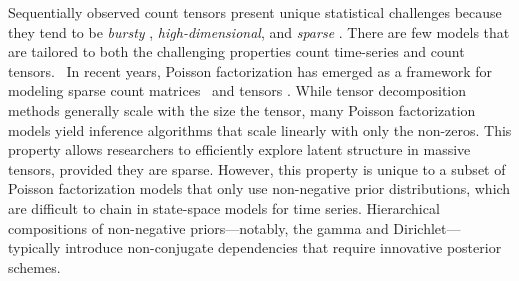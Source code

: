 \documentclass{article}
\begin{document}
% 
Sequentially observed count tensors present unique statistical challenges because they tend to be \emph{bursty} \cite{kleinberg2003bursty}, \emph{high-dimensional}, and \emph{sparse} \cite{chi2012tensors,kunihama2013bayesian}. There are few models that are tailored to both the challenging properties count time-series and count tensors.~
In recent years, Poisson factorization has emerged as a framework for modeling sparse count matrices~\cite{canny2004gap,Dunson2005bayesianlatent,titsias2008infinite,cemgil2009bayesian,zhou2011beta,gopalan2013efficient} and tensors \cite{chi2012tensors,ermis2014bayesian,schein2015bayesian}. While tensor decomposition methods generally scale with the size the tensor, many Poisson factorization models yield inference algorithms that scale linearly with only the non-zeros. This property allows researchers to efficiently explore latent structure in massive tensors, provided they are sparse. However, this property is unique to a subset of Poisson factorization models that only use non-negative prior distributions, which are difficult to chain in state-space models for time series. Hierarchical compositions of non-negative priors---notably, the gamma and Dirichlet---typically introduce non-conjugate dependencies that require innovative posterior schemes.

\end{document}
